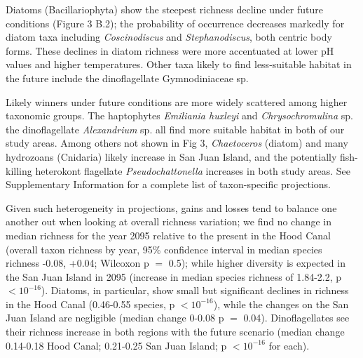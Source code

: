 \documentclass[11pt]{article}
\begin{document}
\begin{linenumbers}
Diatoms (Bacillariophyta) show the steepest richness decline under future conditions (Figure 3 B.2); the probability of occurrence decreases markedly for diatom taxa including \textit{Coscinodiscus} and \textit{Stephanodiscus}, both centric body forms. These declines in diatom richness were more accentuated at lower pH values and higher temperatures. Other taxa likely to find less-suitable habitat in the future include the dinoflagellate Gymnodiniaceae sp.

Likely winners under future conditions are more widely scattered among higher taxonomic groups. The haptophytes \textit{Emiliania huxleyi} and \textit{Chrysochromulina} sp. the dinoflagellate \textit{Alexandrium} sp. all find more suitable habitat in both of our study areas. Among others not shown in Fig 3, \textit{Chaetoceros} (diatom) and many hydrozoans (Cnidaria) likely increase in San Juan Island, and the potentially fish-killing heterokont flagellate \textit{Pseudochattonella} increases in both study areas. See Supplementary Information for a complete list of taxon-specific projections.
 
Given such heterogeneity in projections, gains and losses tend to balance one another out when looking at overall richness variation; we find no change in median richness for the year 2095 relative to the present in the Hood Canal (overall taxon richness by year, 95\% confidence interval in median species richness  -0.08, +0.04; Wilcoxon p $=$ 0.5); while higher diversity is expected in the San Juan Island in 2095 (increase in median species richness of 1.84-2.2, p $< 10^{-16}$). Diatoms, in particular, show small but significant declines in richness in the Hood Canal (0.46-0.55 species, p $< 10^{-16}$), while the changes on the San Juan Island are negligible (median change 0-0.08 p $=$ 0.04).  Dinoflagellates see their richness increase in both regions with the future scenario (median change 0.14-0.18 Hood Canal; 0.21-0.25 San Juan Island; p $< 10^{-16}$ for each).
 


\end{linenumbers}
\end{document}
